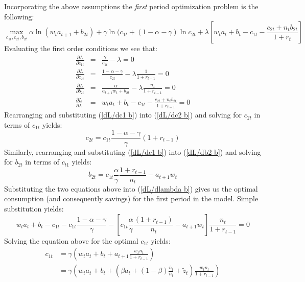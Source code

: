 \documentclass{article}
\begin{document}
Incorporating the above assumptions the \emph{first} period optimization problem is the following:
\begin{equation}
\max_{c_{1t}, c_{2t}, b_{2t}}\alpha \ln (w_t a_{t+1} + b_{2t})
+ \gamma \ln (c_{1t}
+ (1-\alpha-\gamma) \ln c_{2t}
+ \lambda [ w_t a_t + b_t - c_{1t} - \frac{c_{2t} + n_t b_{2t}}{1+r_t}]
\end{equation}
Evaluating the first order conditions we see that:
\begin{eqnarray}
\frac{\partial L}{\partial c_{1t}} &=& \frac{\gamma}{c_{1t}} - \lambda = 0  \label{dL/dc1 b} \\
\frac{\partial L}{\partial c_{2t}} &=& \frac{1-\alpha-\gamma}{c_{2t}}-\lambda\frac{1}{1+r_{t-1}} = 0 \label{dL/dc2 b}\\
\frac{\partial L}{\partial b_{2t}} &=& \frac{\alpha}{a_{t+1} w_t + b_{2t}} - \lambda \frac{n_t}{1+r_{t-1}} = 0 \label{dL/db2 b}\\
\frac{\partial L}{\partial \lambda} &=& w_t a_t + b_t - c_{1t} - \frac{ c_{2t}+ n_t b_{2t}} {1+r_{t-1}}  = 0 \label{dL/dlambda b}
\end{eqnarray}
Rearranging and substituting (\ref{dL/dc1 b}) into (\ref{dL/dc2 b}) and solving for $c_{2t}$ in terms of $c_{1t}$ yields:
\begin{equation}
c_{2t} = c_{1t}\frac{1-\alpha-\gamma}{\gamma}(1+r_{t-1})
\end{equation}
Similarly, rearranging and substituting (\ref{dL/dc1 b}) into (\ref{dL/db2 b}) and solving for $b_{2t}$ in terms of $c_{t1}$ yields:
\begin{equation}
b_{2t} = c_{1t} \frac{\alpha}{\gamma}\frac{1+r_{t-1}}{n_t} - a_{t+1}w_t
\end{equation}
Substituting the two equations above into (\ref{dL/dlambda b}) gives us the optimal consumption (and consequently savings) for the first period in the model. Simple substitution yields:
\begin{equation*}
w_t a_t + b_t - c_{1t} - c_{1t}\frac{1-\alpha-\gamma}{\gamma} - [c_{1t}\frac{\alpha}{\gamma}\frac{(1+r_{t-1})}{n_t}-a_{t+1}w_t]\frac{n_t}{1+r_{t-1}}=0
\end{equation*}
Solving the equation above for the optimal $c_{1t}$ yields:
\begin{equation}\label{opt c1 b}
\begin{split}
c_{1t}
&= \gamma(w_t a_t + b_t + a_{t+1}\frac{w_t n_t}{1+r_{t-1}})\\
&= \gamma(w_t a_t + b_t + (\beta a_t + (1-\beta)\frac{\overline{n}_{t}}{n_t}+\tilde{z}_t)\frac{w_t n_t}{1+r_{t-1}})
\end{split}
\end{equation}
\end{document}
